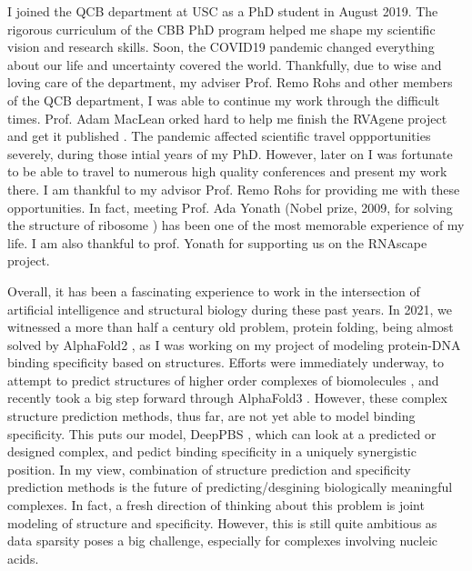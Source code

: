 
I joined the QCB department at USC as a PhD student in August 2019. The rigorous curriculum of the CBB PhD program helped me shape my scientific vision and research skills. Soon, the COVID19 pandemic changed everything about our life and uncertainty covered the world. Thankfully, due to wise and loving care of the department, my adviser Prof. Remo Rohs and other members of the QCB department, I was able to continue my work through the difficult times. Prof. Adam MacLean orked hard to help me finish the RVAgene project and get it published \citep{Mitra2021}. The pandemic affected scientific travel oppportunities severely, during those intial years of my PhD. However, later on I was fortunate to be able to travel to numerous high quality conferences and present my work there. I am thankful to my advisor Prof. Remo Rohs for providing me with these opportunities. In fact, meeting Prof. Ada Yonath (Nobel prize, 2009, for solving the structure of ribosome \citep{schluenzen2000structure, harms2001high}) has been one of the most memorable experience of my life. I am also thankful to prof. Yonath for supporting us on the RNAscape project. 


Overall, it has been a fascinating experience to work in the intersection of artificial intelligence and structural biology during these past years. In 2021, we witnessed a more than half a century old problem, protein folding, being almost solved by AlphaFold2 \citep{Jumper2021}, as I was working on my project of modeling protein-DNA binding specificity based on structures. Efforts were immediately underway, to attempt to predict structures of higher order complexes of biomolecules \citep{evans2021protein,baek2024na}, and recently took a big step forward through AlphaFold3 \citep{Abramson2024}. However, these complex structure prediction methods, thus far, are not yet able to model binding specificity. This puts our model, DeepPBS \citep{Mitra2024}, which can look at a predicted or designed complex, and pedict binding specificity in a uniquely synergistic position. In my view, combination of structure prediction and specificity prediction methods is the future of predicting/desgining biologically meaningful complexes. In fact, a fresh direction of thinking about this problem is joint modeling of structure and specificity. However, this is still quite ambitious as data sparsity poses a big challenge, especially for complexes involving nucleic acids. 

